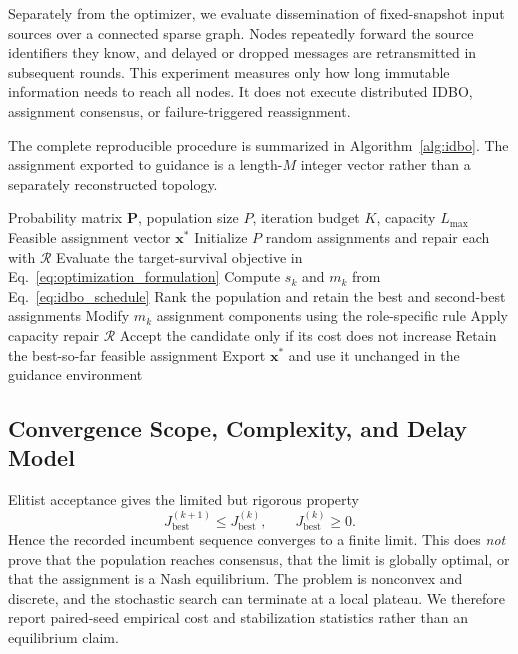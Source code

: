 \documentclass[lettersize,journal]{IEEEtran}
\begin{document}
Separately from the optimizer, we evaluate dissemination of fixed-snapshot input
sources over a connected sparse graph. Nodes repeatedly forward the source
identifiers they know, and delayed or dropped messages are retransmitted in
subsequent rounds. This experiment measures only how long immutable information
needs to reach all nodes. It does not execute distributed IDBO, assignment
consensus, or failure-triggered reassignment.

The complete reproducible procedure is summarized in
Algorithm~\ref{alg:idbo}. The assignment exported to guidance is a length-\(M\)
integer vector rather than a separately reconstructed topology.

\begin{algorithm}[!t]
\caption{Capacity-Constrained IDBO and Assignment Export}
\label{alg:idbo}
\footnotesize
\begin{algorithmic}[1]
\REQUIRE Probability matrix \(\mathbf{P}\), population size \(P\), iteration
budget \(K\), capacity \(L_{\max}\)
\ENSURE Feasible assignment vector \(\mathbf{x}^{*}\)
\STATE Initialize \(P\) random assignments and repair each with \(\mathcal{R}\)
\STATE Evaluate the target-survival objective in
Eq.~\eqref{eq:optimization_formulation}
    \STATE Compute \(s_k\) and \(m_k\) from Eq.~\eqref{eq:idbo_schedule}
    \STATE Rank the population and retain the best and second-best assignments
        \STATE Modify \(m_k\) assignment components using the role-specific rule
        \STATE Apply capacity repair \(\mathcal{R}\)
        \STATE Accept the candidate only if its cost does not increase
    \ENDFOR
    \STATE Retain the best-so-far feasible assignment
\ENDFOR
\STATE Export \(\mathbf{x}^{*}\) and use it unchanged in the guidance environment
\end{algorithmic}
\end{algorithm}

\subsection{Convergence Scope, Complexity, and Delay Model}
\label{subsec:convergence_equilibrium}

Elitist acceptance gives the limited but rigorous property
\begin{equation}
\label{eq:incumbent_monotone}
J_{\mathrm{best}}^{(k+1)}\le J_{\mathrm{best}}^{(k)},\qquad
J_{\mathrm{best}}^{(k)}\ge 0 .
\end{equation}
Hence the recorded incumbent sequence converges to a finite limit. This does
\emph{not} prove that the population reaches consensus, that the limit is
globally optimal, or that the assignment is a Nash equilibrium. The problem is
nonconvex and discrete, and the stochastic search can terminate at a local
plateau. We therefore report paired-seed empirical cost and stabilization
statistics rather than an equilibrium claim.
\end{document}
